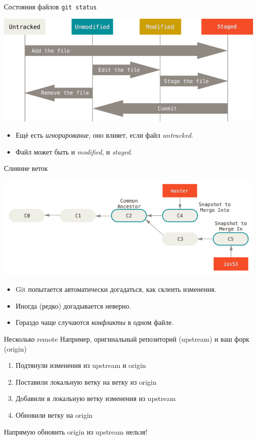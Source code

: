 \begin{frame}[t]{Состояния файлов}
\verb~git status~
\begin{center}
\includegraphics[width=\textwidth,keepaspectratio]{lifecycle.png}
\end{center}
\begin{itemize}
\item Ещё есть \textit{игнорирование}, оно влияет, если файл \textit{untracked}.
\item Файл может быть и \textit{modified}, и \textit{staged}.
\end{itemize}
\end{frame}

\begin{frame}[t]{Слияние веток}
\begin{center}
\includegraphics[width=\textwidth,keepaspectratio]{basic-merging-1.png}
\end{center}
\begin{itemize}
\item Git попытается автоматически догадаться, как склеить изменения.
\item Иногда (редко) догадывается неверно.
\item Гораздо чаще случаются \textit{конфликты} в одном файле.
\end{itemize}
\end{frame}

\begin{frame}[t]{Несколько remote}
Например, оригинальный репозиторий (upstream) и ваш форк (origin)
\begin{enumerate}
\item Подтянули изменения из upstream и origin
\item Поставили локальную ветку на ветку из origin
\item Добавили в локальную ветку изменения из upstream
\item Обновили ветку на origin
\end{enumerate}
Напрямую обновить origin из upstream нельзя!
\end{frame}
